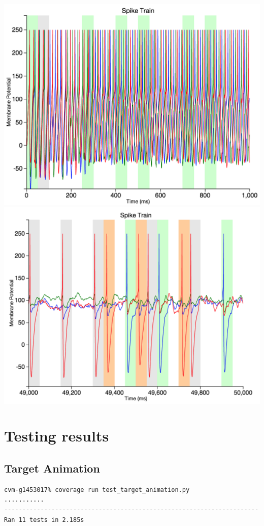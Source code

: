 \documentclass[a4paper,11pt]{article}
\begin{document}
\begin{appendices}
\includegraphics[scale = 0.3]{multiple_beginning}
\includegraphics[scale = 0.3]{multiple_end}
\newpage
\section{Testing results}
\subsection{Target Animation}
\begin{verbatim}
cvm-g1453017% coverage run test_target_animation.py
...........
----------------------------------------------------------------------
Ran 11 tests in 2.185s


\end{verbatim}
\end{appendices}
\end{document}
